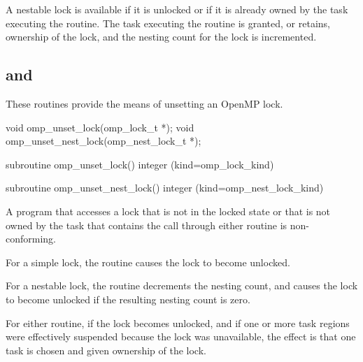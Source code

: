 A nestable lock is available if it is unlocked or if it is already owned by 
the task executing the routine. The task executing the routine is granted, 
or retains, ownership of the lock, and the nesting count for the lock is 
incremented.




\subsection{ and }
\label{subsec:omp_unset_lock and omp_unset_nest_lock}
\summary
These routines provide the means of unsetting an OpenMP lock.

\format
\ccppspecificstart
\begin{boxedcode}
void omp\_unset\_lock(omp\_lock\_t *);
void omp\_unset\_nest\_lock(omp\_nest\_lock\_t *);
\end{boxedcode}
\ccppspecificend

\fortranspecificstart
\begin{boxedcode}
subroutine omp\_unset\_lock()
integer (kind=omp\_lock\_kind) 

subroutine omp\_unset\_nest\_lock()
integer (kind=omp\_nest\_lock\_kind) 
\end{boxedcode}
\fortranspecificend

\constraints
A program that accesses a lock that is not in the locked state or that is 
not owned by the task that contains the call through either routine is 
non-conforming.


\effect
For a simple lock, the  routine causes the lock to become unlocked.

For a nestable lock, the  routine decrements the nesting 
count, and causes the lock to become unlocked if the resulting nesting count is zero.

For either routine, if the lock becomes unlocked, and if one or more task 
regions were effectively suspended because the lock was unavailable, the 
effect is that one task is chosen and given ownership of the lock. 









